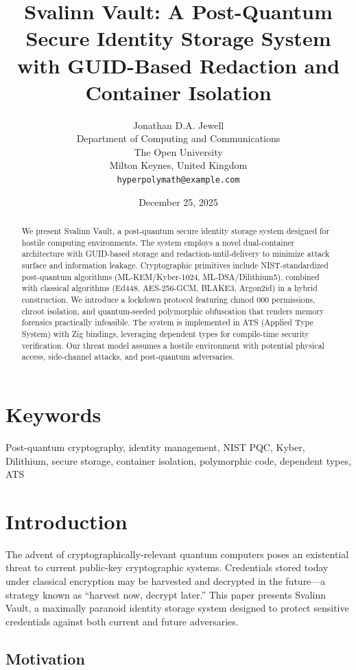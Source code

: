 \documentclass[11pt,a4paper]{article}
\title{Svalinn Vault: A Post-Quantum Secure Identity Storage System\\
with GUID-Based Redaction and Container Isolation}
\author{Jonathan D.A. Jewell\\
Department of Computing and Communications\\
The Open University\\
Milton Keynes, United Kingdom\\
\texttt{hyperpolymath@example.com}}
\date{December 25, 2025}
\begin{document}
\maketitle

\begin{abstract}
We present Svalinn Vault, a post-quantum secure identity storage system designed for hostile computing environments. The system employs a novel dual-container architecture with GUID-based storage and redaction-until-delivery to minimize attack surface and information leakage. Cryptographic primitives include NIST-standardized post-quantum algorithms (ML-KEM/Kyber-1024, ML-DSA/Dilithium5), combined with classical algorithms (Ed448, AES-256-GCM, BLAKE3, Argon2id) in a hybrid construction. We introduce a lockdown protocol featuring chmod 000 permissions, chroot isolation, and quantum-seeded polymorphic obfuscation that renders memory forensics practically infeasible. The system is implemented in ATS (Applied Type System) with Zig bindings, leveraging dependent types for compile-time security verification. Our threat model assumes a hostile environment with potential physical access, side-channel attacks, and post-quantum adversaries.
\end{abstract}

\section*{Keywords}
Post-quantum cryptography, identity management, NIST PQC, Kyber, Dilithium, secure storage, container isolation, polymorphic code, dependent types, ATS

\section{Introduction}

The advent of cryptographically-relevant quantum computers poses an existential threat to current public-key cryptographic systems. Credentials stored today under classical encryption may be harvested and decrypted in the future---a strategy known as ``harvest now, decrypt later.'' This paper presents Svalinn Vault, a maximally paranoid identity storage system designed to protect sensitive credentials against both current and future adversaries.

\subsection{Motivation}
\end{document}
